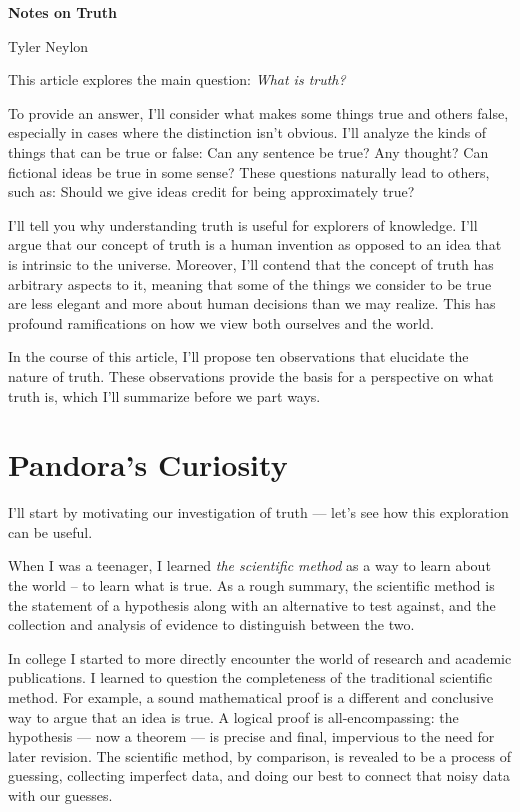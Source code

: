 \documentclass[11pt, oneside]{article}
\theoremstyle{argtstyle}
\begin{document}
{\bf Notes on Truth}

Tyler Neylon

\bigskip

This article explores the main question: {\em What is truth?}

To provide an answer, I'll consider what makes some things true and
others false, especially in cases where the distinction isn't obvious.
I'll analyze the kinds of things that can be true or false:
Can any sentence be true? Any thought?
Can fictional ideas be true in some sense?
These questions naturally lead to others, such
as:
Should we give ideas credit for being approximately true?

I'll tell you why understanding truth is useful for explorers of
knowledge.
I'll argue that our concept of truth is a human invention as opposed to an idea
that is intrinsic to the universe.
Moreover, I'll contend
that the concept of truth has arbitrary aspects to it, meaning that some of
the things we consider to be true are less elegant and more about human
decisions than
we may realize. This has profound ramifications on how we
view both ourselves and the world.

In the course of this article, I'll propose ten
observations that elucidate the nature of truth.
These observations provide the basis for a
perspective on what truth is, which I'll summarize
before we part ways.

\section{Pandora's Curiosity}

I'll start by motivating our investigation of truth ---
let's see how this exploration can be useful.

When I was a teenager, I learned {\em the scientific method} as a way to
learn about the world -- to learn what is true.
As a rough summary,
the scientific method is the statement
of a hypothesis along with an alternative to test against, and
the collection and analysis of evidence to distinguish between
the two.

In college
I started to more directly encounter the world of research
and academic publications.
I learned to question the completeness of the traditional scientific method.
For example, a sound mathematical proof is a different and
conclusive way
to argue that an idea is true.
A logical proof is all-encompassing: the hypothesis --- now a theorem
--- is
precise and final,
impervious to the need for later revision.
The scientific method, by comparison, is revealed to be
a process of guessing, collecting imperfect data, and doing our best to
connect that noisy data with our guesses.
\end{document}
